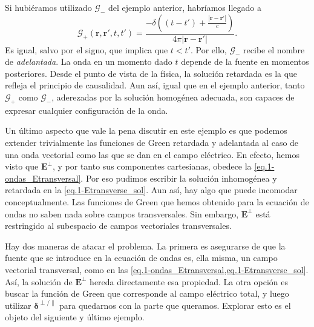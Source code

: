 \begin{example}
    Si hubiéramos utilizado \(\mathcal{G}_-\) del ejemplo anterior, habríamos llegado a
        \begin{equation}
        \label{eq.1-green_ondas_escalar_avanzada}
        \mathcal{G}_+(\mathbf{r}, \mathbf{r}', t, t') =\frac{-\delta\left((t-t') + \frac{|\mathbf{r}-\mathbf{r}'|}{c} \right)}{4\pi|\mathbf{r}-\mathbf{r}'|}.
    \end{equation}
    Es igual, salvo por el signo, que implica que \(t<t'\). Por ello, \(\mathcal{G}_-\) recibe el nombre de \emph{adelantada}. La onda en un momento dado \(t\) depende de la fuente en momentos posteriores. Desde el punto de vista de la física, la solución retardada es la que refleja el principio de causalidad. Aun así, igual que en el ejemplo anterior, tanto \(\mathcal{G}_+\) como \(\mathcal{G}_-\), aderezadas por la solución homogénea adecuada, son capaces de expresar cualquier configuración de la onda.

    Un último aspecto que vale la pena discutir en este ejemplo es que podemos extender trivialmente las funciones de Green retardada y adelantada al caso de una onda vectorial como las que se dan en el campo eléctrico. En efecto, hemos visto que \(\mathbf{E}^\perp\), y por tanto sus componentes cartesianas, obedece la \cref{eq.1-ondas_Etransversal}. Por eso pudimos escribir la solución inhomogénea y retardada en la \cref{eq.1-Etransverse_sol}. Aun así, hay algo que puede incomodar conceptualmente. Las funciones de Green que hemos obtenido para la ecuación de ondas no saben nada sobre campos transversales. Sin embargo, \(\mathbf{E}^\perp\) está restringido al subespacio de campos vectoriales transversales. 
    
    Hay dos maneras de atacar el problema. La primera es asegurarse de que la fuente que se introduce en la ecuación de ondas es, ella misma, un campo vectorial transversal, como en las \cref{eq.1-ondas_Etransversal,eq.1-Etransverse_sol}. Así, la solución de \(\mathbf{E}^\perp\) hereda directamente esa propiedad. La otra opción es buscar la función de Green que corresponde al campo eléctrico total, y luego utilizar \(\boldsymbol{\delta}^{\perp/\parallel}\) para quedarnos con la parte que queramos. Explorar esto es el objeto del siguiente y último ejemplo.
\end{example}


